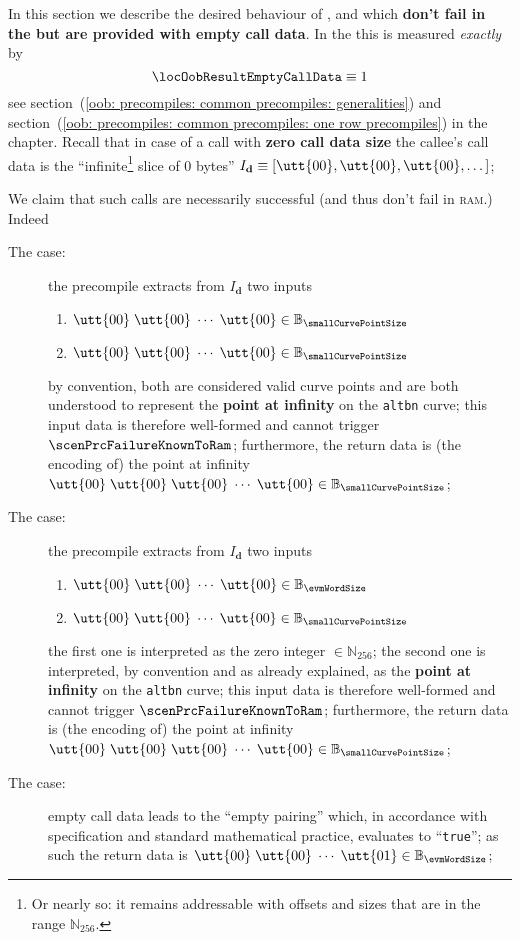 In this section we describe the desired behaviour of ,  and  which \textbf{don't fail in the \hubMod{} but are provided with empty call data}.
In the \hubMod{} this is measured \emph{exactly} by
\[
	\locOobResultEmptyCallData \equiv 1
\]
see
section~(\ref{oob: precompiles: common precompiles: generalities}) and
section~(\ref{oob: precompiles: common precompiles: one row precompiles})
in the \oobMod{} chapter.
Recall that in case of a call with \textbf{zero call data size} the callee's call data is the ``infinite\footnote{Or nearly so: it remains addressable with offsets and sizes that are in the range $\mathbb{N}_{256}$.} slice of 0 bytes'' $I_\textbf{d} \equiv [\utt{00},
\utt{00},
\utt{00}, \dots]$;

We claim that such calls are necessarily successful (and thus don't fail in \textsc{ram}.)
Indeed
\begin{description}
	\item[The  case:] 
		the precompile extracts from $I_\textbf{d}$ two inputs
		\begin{enumerate}
		        \item $
				\utt{00} \;
				\utt{00} \; \cdots \;
				\utt{00} \in \mathbb{B}_{\smallCurvePointSize}$
		        \item $
				\utt{00} \;
				\utt{00} \; \cdots \;
				\utt{00} \in \mathbb{B}_{\smallCurvePointSize}$
		\end{enumerate}
		by \evm{} convention, both are considered valid curve points and are both understood to represent the \textbf{point at infinity} on the \texttt{altbn} curve;
		this input data is therefore well-formed and cannot trigger $\scenPrcFailureKnownToRam$; 
		furthermore, the return data is (the \evm{} encoding of) the point at infinity
		$
		\utt{00} \;
		\utt{00} \;
		\utt{00} \; \cdots \;
		\utt{00} \in \mathbb{B}_{\smallCurvePointSize}$;
	\item[The  case:] 
		the precompile extracts from $I_\textbf{d}$ two inputs
		\begin{enumerate}
		        \item $
				\utt{00} \;
				\utt{00} \; \cdots \;
				\utt{00} \in \mathbb{B}_{\evmWordSize}$
		        \item $
				\utt{00} \;
				\utt{00} \; \cdots \;
				\utt{00} \in \mathbb{B}_{\smallCurvePointSize}$
		\end{enumerate}
		the first one is interpreted as the zero integer $\in \mathbb{N}_{256}$;
		the second one is interpreted, by \evm{} convention and as already explained, as the \textbf{point at infinity} on the \texttt{altbn} curve;
		this input data is therefore well-formed and cannot trigger $\scenPrcFailureKnownToRam$; 
		furthermore, the return data is (the \evm{} encoding of) the point at infinity
		$
		\utt{00} \;
		\utt{00} \;
		\utt{00} \; \cdots \;
		\utt{00} \in \mathbb{B}_{\smallCurvePointSize}$;
	\item[The  case:]
		empty call data leads to the ``empty pairing'' which, in accordance with \evm{} specification and standard mathematical practice, evaluates to ``\texttt{true}'';
		as such the return data is
		$
		\utt{00} \;
		\utt{00} \; \cdots \;
		\utt{01} \in \mathbb{B}_{\evmWordSize}$;
\end{description}
